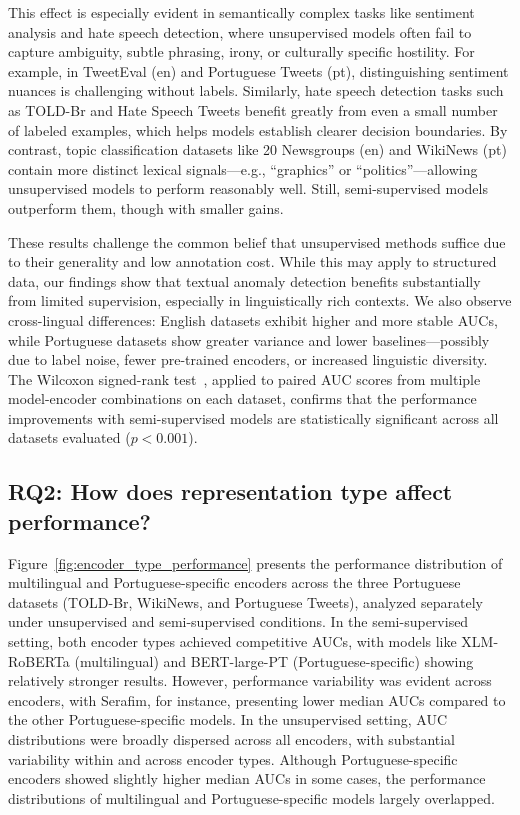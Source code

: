 \documentclass[12pt]{article}
\begin{document}
This effect is especially evident in semantically complex tasks like sentiment analysis and hate speech detection, where unsupervised models often fail to capture ambiguity, subtle phrasing, irony, or culturally specific hostility. For example, in TweetEval (en) and Portuguese Tweets (pt), distinguishing sentiment nuances is challenging without labels. Similarly, hate speech detection tasks such as TOLD-Br and Hate Speech Tweets benefit greatly from even a small number of labeled examples, which helps models establish clearer decision boundaries.
By contrast, topic classification datasets like 20 Newsgroups (en) and WikiNews (pt) contain more distinct lexical signals—e.g., “graphics” or “politics”—allowing unsupervised models to perform reasonably well. Still, semi-supervised models outperform them, though with smaller gains.

These results challenge the common belief that unsupervised methods suffice due to their generality and low annotation cost. While this may apply to structured data, our findings show that textual anomaly detection benefits substantially from limited supervision, especially in linguistically rich contexts. We also observe cross-lingual differences: English datasets exhibit higher and more stable AUCs, while Portuguese datasets show greater variance and lower baselines—possibly due to label noise, fewer pre-trained encoders, or increased linguistic diversity. The Wilcoxon signed-rank test~\cite{wilcoxon1945individual}, applied to paired AUC scores from multiple model-encoder combinations on each dataset, confirms that the performance improvements with semi-supervised models are statistically significant across all datasets evaluated ($p < 0.001$).

\subsection{RQ2: How does representation type affect performance?}

Figure~\ref{fig:encoder_type_performance} presents the performance distribution of multilingual and Portuguese-specific encoders across the three Portuguese datasets (TOLD-Br, WikiNews, and Portuguese Tweets), analyzed separately under unsupervised and semi-supervised conditions. In the semi-supervised setting, both encoder types achieved competitive AUCs, with models like XLM-RoBERTa (multilingual) and BERT-large-PT (Portuguese-specific) showing relatively stronger results. However, performance variability was evident across encoders, with Serafim, for instance, presenting lower median AUCs compared to the other Portuguese-specific models.
In the unsupervised setting, AUC distributions were broadly dispersed across all encoders, with substantial variability within and across encoder types. Although Portuguese-specific encoders showed slightly higher median AUCs in some cases, the performance distributions of multilingual and Portuguese-specific models largely overlapped.
\end{document}
